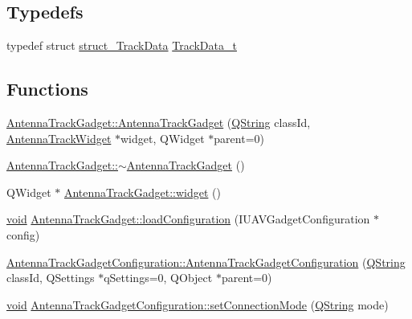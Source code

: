 \subsection*{\-Typedefs}
\begin{DoxyCompactItemize}
\item 
typedef struct \hyperlink{structstruct___track_data}{struct\-\_\-\-Track\-Data} \hyperlink{group___antenna_track_gadget_plugin_ga2a189738d52fd5df21e4a823d19ad1ac}{\-Track\-Data\-\_\-t}
\end{DoxyCompactItemize}
\subsection*{\-Functions}
\begin{DoxyCompactItemize}
\item 
\hyperlink{group___antenna_track_gadget_plugin_gafa295298db3662b9107fa1506ab434f7}{\-Antenna\-Track\-Gadget\-::\-Antenna\-Track\-Gadget} (\hyperlink{group___u_a_v_objects_plugin_gab9d252f49c333c94a72f97ce3105a32d}{\-Q\-String} class\-Id, \hyperlink{class_antenna_track_widget}{\-Antenna\-Track\-Widget} $\ast$widget, \-Q\-Widget $\ast$parent=0)
\item 
\hyperlink{group___antenna_track_gadget_plugin_ga90012834df22b16c7824162b33eae46d}{\-Antenna\-Track\-Gadget\-::$\sim$\-Antenna\-Track\-Gadget} ()
\item 
\-Q\-Widget $\ast$ \hyperlink{group___antenna_track_gadget_plugin_ga890a1b4ef09527df4e205d76d2378da1}{\-Antenna\-Track\-Gadget\-::widget} ()
\item 
\hyperlink{group___u_a_v_objects_plugin_ga444cf2ff3f0ecbe028adce838d373f5c}{void} \hyperlink{group___antenna_track_gadget_plugin_ga05e5ae93f50d470a38cd699e5662fcbf}{\-Antenna\-Track\-Gadget\-::load\-Configuration} (\-I\-U\-A\-V\-Gadget\-Configuration $\ast$config)
\item 
\hyperlink{group___antenna_track_gadget_plugin_gaab0b8cb9542f69d06b53e54d5bb4761a}{\-Antenna\-Track\-Gadget\-Configuration\-::\-Antenna\-Track\-Gadget\-Configuration} (\hyperlink{group___u_a_v_objects_plugin_gab9d252f49c333c94a72f97ce3105a32d}{\-Q\-String} class\-Id, \-Q\-Settings $\ast$q\-Settings=0, \-Q\-Object $\ast$parent=0)
\item 
\hyperlink{group___u_a_v_objects_plugin_ga444cf2ff3f0ecbe028adce838d373f5c}{void} \hyperlink{group___antenna_track_gadget_plugin_gaa8c80d59aa822d7e1a73288f8da1447d}{\-Antenna\-Track\-Gadget\-Configuration\-::set\-Connection\-Mode} (\hyperlink{group___u_a_v_objects_plugin_gab9d252f49c333c94a72f97ce3105a32d}{\-Q\-String} mode)

\end{DoxyCompactItemize}
